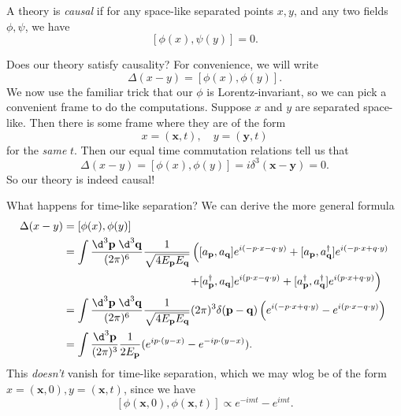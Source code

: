 \documentclass[a4paper]{article}
\begin{document}
\begin{defi}
  A theory is \emph{causal} if for any space-like separated points $x, y$, and any two fields $\phi, \psi$, we have
  \[
    [\phi(x), \psi(y)] = 0.
  \]
\end{defi}
Does our theory satisfy causality? For convenience, we will write
\[
  \Delta(x - y) = [\phi(x), \phi(y)].
\]
We now use the familiar trick that our $\phi$ is Lorentz-invariant, so we can pick a convenient frame to do the computations. Suppose $x$ and $y$ are separated space-like. Then there is some frame where they are of the form
\[
  x = (\mathbf{x}, t),\quad y = (\mathbf{y}, t)
\]
for the \emph{same} $t$. Then our equal time commutation relations tell us that
\[
  \Delta(x - y) = [\phi(x), \phi(y)] = i \delta^3(\mathbf{x} - \mathbf{y}) = 0.
\]
So our theory is indeed causal!

What happens for time-like separation? We can derive the more general formula
\begin{align*}
  \Delta(x - y) &= [\phi(x), \phi(y)]\\
  &= \int \frac{\d^3 \mathbf{p}\;\d^3 \mathbf{q}}{(2\pi)^6}\frac{1}{\sqrt{4E_\mathbf{p} E_\mathbf{q}}} \left([a_\mathbf{p}, a_\mathbf{q}]e^{i(- p\cdot x - q\cdot y)} + [a_\mathbf{p}, a_\mathbf{q}^\dagger] e^{i(-p \cdot x + q\cdot y)}\right.\\
  &\hphantom{= \int \frac{\d^3 \mathbf{p}\;\d^3 \mathbf{q}}{(2\pi)^6}\frac{1}{\sqrt{4E_\mathbf{p} E_\mathbf{q}}}} \left.+[a_\mathbf{p}^\dagger, a_\mathbf{q}]e^{i(p\cdot x - q\cdot y)} + [a_\mathbf{p}^\dagger, a_\mathbf{q}^\dagger] e^{i(p\cdot x + q \cdot y)}\right)\\
  &= \int \frac{\d^3 \mathbf{p}\;\d^3 \mathbf{q}}{(2\pi)^6}\frac{1}{\sqrt{4E_\mathbf{p} E_\mathbf{q}}} (2\pi)^3 \delta(\mathbf{p} - \mathbf{q}) \left(e^{i(-p \cdot x + q\cdot y)} - e^{i(p\cdot x - q \cdot y)}\right)\\
  &= \int \frac{\d^3 \mathbf{p}}{(2\pi)^3}\frac{1}{2E_\mathbf{p}} (e^{ip\cdot(y - x)} - e^{-ip\cdot(y - x)}).
\end{align*}
This \emph{doesn't} vanish for time-like separation, which we may wlog be of the form $x = (\mathbf{x}, 0), y = (\mathbf{x}, t)$, since we have
\[
  [\phi(\mathbf{x}, 0), \phi (\mathbf{x}, t)] \propto e^{-imt} - e^{imt}.
\]
%
%
%
\end{document}
